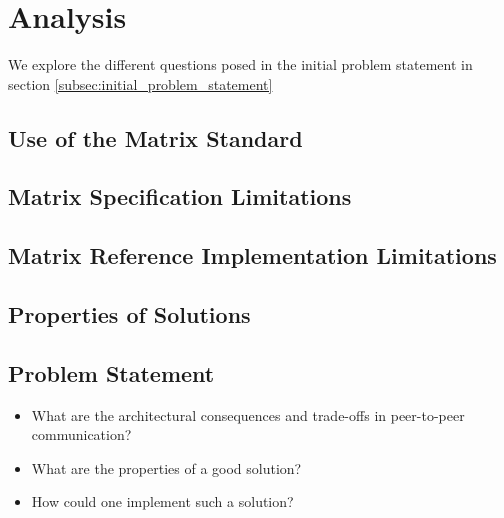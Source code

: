 \section{Analysis}
We explore the different questions posed in the initial problem statement in section \ref{subsec:initial_problem_statement}

\subsection{Use of the Matrix Standard}
\subsection{Matrix Specification Limitations}
\subsection{Matrix Reference Implementation Limitations}
\subsection{Properties of Solutions}

\subsection{Problem Statement}
\begin{itemize}
    \item What are the architectural consequences and trade-offs in peer-to-peer communication?
    \item What are the properties of a good solution?
    \item How could one implement such a solution?
\end{itemize}
